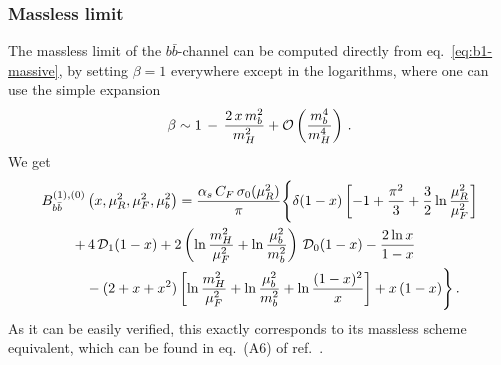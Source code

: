 \subsubsection{Massless limit}
The massless limit of the $b\bar{b}$-channel can be computed directly
from eq.~\eqref{eq:b1-massive},
by setting $\beta=1$ everywhere except in the logarithms, where
one can use the simple expansion
\begin{equation}
  \label{eq:beta}
  \beta \sim 1\,-\,\frac{2\,x\,m_b^2}{m_H^2} + {\cal O}\left( \frac{m_b^4}{m_H^4} \right)\,.
\end{equation}
We get
\begin{equation}
  \label{eq:b1-massless}
  \begin{split}
    B_{b\bar{b}}^{(1),(0)}&\left(x,\mu_R^2,\mu_F^2,\mu_b^2 \right) = 
    \frac{\alpha_s \, C_F\,\sigma_0(\mu_R^2)}{\pi}
    \Biggl\{
      \delta(1-x)\left[ -1+ \frac{\pi^2}{3} + \frac{3}{2}
          \ln\frac{\mu_R^2}{\mu_F^2} \right] \\+&\,4\,{\cal
        D}_1(1-x) 
      +  2\left( 
      \ln{\frac{m_H^2}{\mu_F^2}}+ \ln{\frac{\mu_b^2}{m_b^2}}\right)\,{\cal D}_0(1-x)
      -\frac{2\ln x}{1-x}  \\
      &- (2 + x + x^2)\left[
        \ln\frac{m_H^2}{\mu_F^2} +\ln{\frac{\mu_b^2}{m_b^2}} + \ln \frac{(1-x)^2}{x}\right]+ x\,(1-x)  \Biggr\}\,.
  \end{split} 
\end{equation}
As it can be easily verified, this exactly corresponds to its massless
scheme equivalent, which can be found in eq.~(A6) of ref.~\cite{Harlander:2003ai}.
